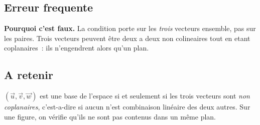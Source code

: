 

\subsection*{Erreur frequente}


\textbf{Pourquoi c'est faux.} La condition porte sur les \emph{trois} vecteurs
ensemble, pas sur les paires. Trois vecteurs peuvent être deux a deux non
colineaires tout en etant coplanaires~: ils n'engendrent alors qu'un plan.


\subsection*{A retenir}

$(\vec{u},\vec{v},\vec{w})$ est une base de l'espace si et seulement si les
trois vecteurs sont \emph{non coplanaires}, c'est-a-dire si aucun n'est
combinaison linéaire des deux autres. Sur une figure, on vérifie qu'ils ne
sont pas contenus dans un même plan.

